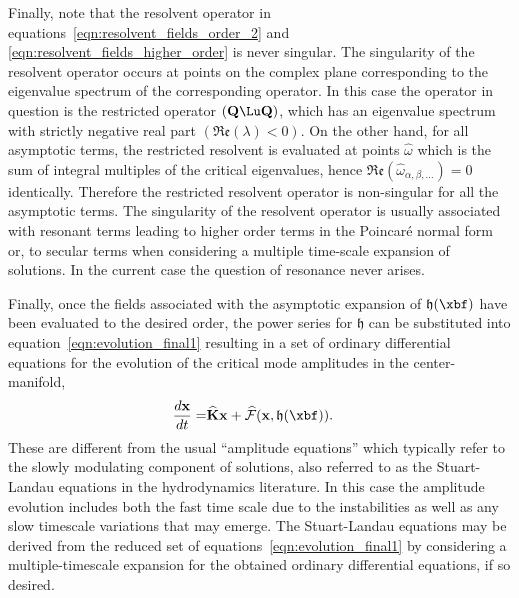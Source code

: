 Finally, note that the resolvent operator in equations~\eqref{eqn:resolvent_fields_order_2} and \eqref{eqn:resolvent_fields_higher_order} is never singular. The singularity of the resolvent operator occurs at points on the complex plane corresponding to the eigenvalue spectrum of the corresponding operator. In this case the operator in question is the restricted operator $(\mathbf{Q}\Lu\mathbf{Q})$, which has an eigenvalue spectrum with strictly negative real part $(\mathfrak{Re}(\lambda) < 0)$. On the other hand, for all asymptotic terms, the restricted resolvent is evaluated at points $\widehat{\omega}$ which is the sum of integral multiples of the critical eigenvalues, hence $\mathfrak{Re}(\widehat{\omega}_{\alpha,\beta,\ldots}) = 0$ identically. Therefore the restricted resolvent operator is non-singular for all the asymptotic terms. The singularity of the resolvent operator is usually associated with resonant terms leading to higher order terms in the Poincar\'{e} normal form or, to secular terms when considering a multiple time-scale expansion of solutions. In the current case the question of resonance never arises. 

Finally, once the fields associated with the asymptotic expansion of $\mathfrak{h}(\xbf)$ have been evaluated to the desired order, the power series for $\mathfrak{h}$ can be substituted into equation~\eqref{eqn:evolution_final1} resulting in a set of ordinary differential equations for the evolution of the critical mode amplitudes in the center-manifold,
\begin{align}
	\dfrac{d\mathbf{x}}{d t} =& \mathbf{\widehat{K}}\mathbf{x} + \mathcal{\widehat{F}}(\mathbf{x},\mathfrak{h}(\xbf)) \label{eqn:amplitude}.
\end{align}
These are different from the usual ``amplitude equations'' \cite{newell69,cross80,cross09} which typically refer to the slowly modulating component of solutions, also referred to as the Stuart-Landau equations \citep{stuart58,stuart60,sipp07} in the hydrodynamics literature. In this case the amplitude evolution includes both the fast time scale due to the instabilities as well as any slow timescale variations that may emerge. The Stuart-Landau equations may be derived from the reduced set of equations~\eqref{eqn:evolution_final1} by considering a multiple-timescale expansion for the obtained ordinary differential equations, if so desired. 


















